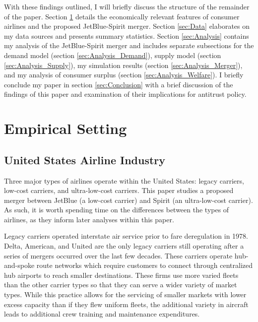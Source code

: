 \documentclass{article}
\begin{document}
    With these findings outlined, I will briefly discuss the structure of the remainder of the paper. Section \ref{sec:Setting} details the economically relevant features of consumer airlines and the proposed JetBlue-Spirit merger. Section \ref{sec:Data} elaborates on my data sources and presents summary statistics. Section \ref{sec:Analysis} contains my analysis of the JetBlue-Spirit merger and includes separate subsections for the demand model (section \ref{sec:Analysis_Demand}), supply model (section \ref{sec:Analysis_Supply}), my simulation results (section \ref{sec:Analysis_Merger}), and my analysis of consumer surplus (section \ref{sec:Analysis_Welfare}).  I briefly conclude my paper in section \ref{sec:Conclusion} with a brief discussion of the findings of this paper and examination of their implications for antitrust policy. 

  
	
	\section{Empirical Setting}
	\label{sec:Setting}
	
	\subsection{United States Airline Industry}
	\label{sec:Setting_Aviation}
	Three major types of airlines operate within the United States: legacy carriers, low-cost carriers, and ultra-low-cost carriers. This paper studies a proposed merger between JetBlue (a low-cost carrier) and Spirit (an ultra-low-cost carrier). As such, it is worth spending time on the differences between the types of airlines, as they inform later analyses within this paper. 	
    
	Legacy carriers operated interstate air service prior to fare deregulation in 1978. Delta, American, and United are the only legacy carriers still operating after a series of mergers occurred over the last few decades. These carriers operate hub-and-spoke route networks which require customers to connect through centralized hub airports to reach smaller destinations. These firms use more varied fleets than the other carrier types so that they can serve a wider variety of market types. While this practice allows for the servicing of smaller markets with lower excess capacity than if they flew uniform fleets, the additional variety in aircraft leads to additional crew training and maintenance expenditures.    
	
\end{document}
